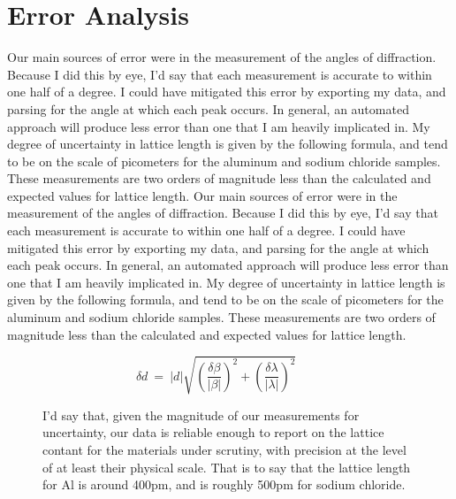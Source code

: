 \documentclass{amsart}
\begin{document}
\section{Error Analysis}
Our main sources of error were in the measurement of the angles of diffraction. Because I did this by eye, I'd say that each measurement is accurate to within one half of a degree. I could have mitigated this error by exporting my data, and parsing for the angle at which each peak occurs. In general, an automated approach will produce less error than one that I am heavily implicated in. My degree of uncertainty in lattice length is given by the following formula, and tend to be on the scale of picometers for the aluminum and sodium chloride samples. These measurements are two orders of magnitude less than the calculated and expected values for lattice length. Our main sources of error were in the measurement of the angles of diffraction. Because I did this by eye, I'd say that each measurement is accurate to within one half of a degree. I could have mitigated this error by exporting my data, and parsing for the angle at which each peak occurs. In general, an automated approach will produce less error than one that I am heavily implicated in. My degree of uncertainty in lattice length is given by the following formula, and tend to be on the scale of picometers for the aluminum and sodium chloride samples. These measurements are two orders of magnitude less than the calculated and expected values for lattice length.
\vspace{-0.2cm}
\begin{figure}[H]
    \begin{minipage}{0.3\textwidth}
        \[\delta d \ = \ |d|\sqrt{\left(\dfrac {\delta \beta }{|\beta|}\right)^2 + \left(\dfrac{\delta \lambda}{|\lambda|}\right)^2} \ \ \ \ \ \ \ \ \ \ \]
    \end{minipage}
    \begin{minipage}{0.65\textwidth}
        I'd say that, given the magnitude of our measurements for uncertainty, our data is reliable enough to report on the lattice contant for the materials under scrutiny, with precision at the level of at least their physical scale. That is to say that the lattice length for Al is around 400pm, and is roughly 500pm for sodium chloride.
    \end{minipage}
\end{figure}
\end{document}
